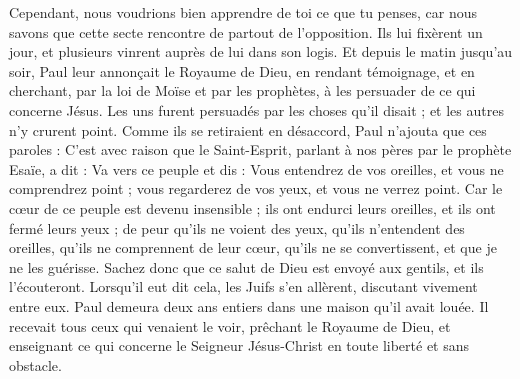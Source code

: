\begin{multicols}{2}
Cependant, nous voudrions bien apprendre de toi ce que tu penses, car nous savons que cette secte rencontre de partout de l’opposition.
Ils lui fixèrent un jour, et plusieurs vinrent auprès de lui dans son logis. Et depuis le matin jusqu’au soir, Paul leur annonçait le Royaume de Dieu, en rendant témoignage, et en cherchant, par la loi de Moïse et par les prophètes, à les persuader de ce qui concerne Jésus.
Les uns furent persuadés par les choses qu'il disait ; et les autres n'y crurent point.
Comme ils se retiraient en désaccord, Paul n’ajouta que ces paroles : C’est avec raison que le Saint-Esprit, parlant à nos pères par le prophète Esaïe, a dit :
Va vers ce peuple et dis : Vous entendrez de vos oreilles, et vous ne comprendrez point ; vous regarderez de vos yeux, et vous ne verrez point.
Car le cœur de ce peuple est devenu insensible ; ils ont endurci leurs oreilles, et ils ont fermé leurs yeux ; de peur qu'ils ne voient des yeux, qu'ils n'entendent des oreilles, qu'ils ne comprennent de leur cœur, qu'ils ne se convertissent, et que je ne les guérisse.
Sachez donc que ce salut de Dieu est envoyé aux gentils, et ils l’écouteront.
Lorsqu’il eut dit cela, les Juifs s’en allèrent, discutant vivement entre eux.
Paul demeura deux ans entiers dans une maison qu'il avait louée. Il recevait tous ceux qui venaient le voir,
prêchant le Royaume de Dieu, et enseignant ce qui concerne le Seigneur Jésus-Christ en toute liberté et sans obstacle.
\PPE{}
\end{multicols}
